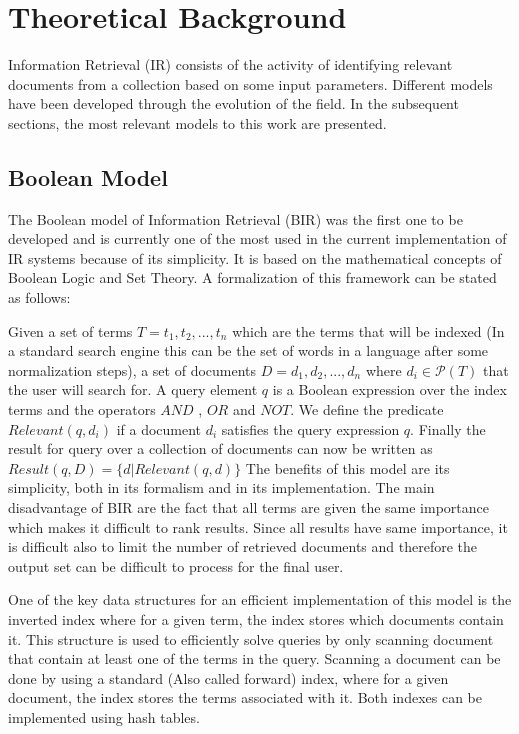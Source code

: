 \chapter{Theoretical Background}
\label{chapter-theoretical_background}
Information Retrieval (IR) consists of the activity of identifying relevant documents from a collection based on some input parameters.
Different models have been developed through the evolution of the field. In the subsequent sections, the most relevant models to this work are presented.

\section{Boolean Model}
The Boolean model of Information Retrieval (BIR) was the first one to be developed and is currently one of the most used in the current implementation of IR systems because of its simplicity. It is based on the mathematical concepts of Boolean Logic and Set Theory. A formalization of this framework can be stated as follows: 

Given a set of terms $T = {t_1, t_2, ... , t_n}$ which are the terms that will be indexed (In a standard search engine this can be the set of words in a language after some normalization steps), a set of documents $D = {d_1, d_2, ... , d_n} $ where $d_i \in \mathcal{P}(T) $ that the user will search for. 
A query element $q$ is a Boolean expression over the index terms and the operators $AND$ , $OR$ and $NOT$. We define the predicate $ Relevant(q, d_i) $ if a document $d_i$ satisfies the query expression $q$.
Finally the result for query over a collection of documents can now be written as $Result(q, D) = \{d | Relevant(q, d)\}$
The benefits of this model are its simplicity, both in its formalism and in its implementation. 
The main disadvantage of  BIR are the fact that all terms are given the same importance which makes it difficult to rank results. Since all results have same importance, it is difficult also to limit the number of retrieved documents and therefore the output set can be difficult to process for the final user.

One of the key data structures for an efficient implementation of this model is the inverted index where for a given term, the index stores which documents contain it. This structure is used to efficiently solve queries by only scanning document that contain at least one of the terms in the query. Scanning a document can be done by using a standard (Also called forward) index, where for a given document, the index stores the terms associated with it. Both indexes can be implemented using hash tables.

